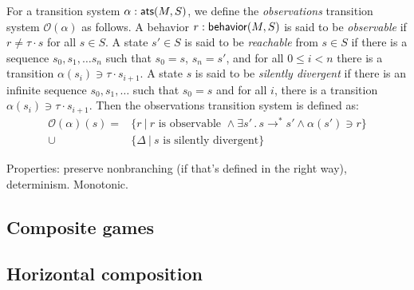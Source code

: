 \begin{definition}
For a transition system $\alpha :  \mathsf{ats} (M, S)$,
we define the \emph{observations} transition system
$\mathcal{O}(\alpha)$ as follows.
A behavior $r :  \mathsf{behavior} (M, S)$ is said to be
\emph{observable} if $r \ne \tau \cdot s$ for all $s \in S$.
A state $s' \in S$ is said to be \emph{reachable} from $s \in S$
if there is a sequence $s_0, s_1, \ldots s_n$ such that
$s_0 = s$, $s_n = s'$,
and for all $0 \le i < n$
there is a transition $\alpha(s_i) \ni \tau \cdot s_{i+1}$.
A state $s$ is said to be \emph{silently divergent}
if there is an infinite sequence $s_0, s_1, \ldots$
such that $s_0 = s$ and for all $i$,
there is a transition $\alpha(s_i) \ni \tau \cdot s_{i+1}$.
Then the observations transition system is defined as:
\begin{align*}
    \mathcal{O}(\alpha)(s) = &\{ r \:|\: r \mbox{ is observable } \wedge
         \exists s' \,.\, s \rightarrow^* s' \wedge
		\alpha(s') \ni r \} \\
      \cup &\{ \Delta \:|\: s \mbox{ is silently divergent} \}
\end{align*}
\end{definition}

Properties:
preserve nonbranching (if that's defined in the right way), determinism.
Monotonic.

\subsection{Composite games}




\subsection{Horizontal composition}





